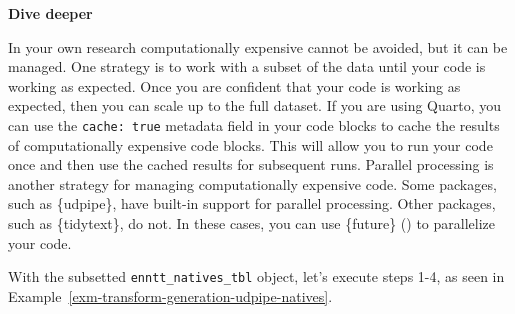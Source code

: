 \documentclass[
  letterpaper,
  krantz1]{latex/krantz-mod}
\theoremstyle{definition}
\theoremstyle{definition}
\theoremstyle{remark}
\begin{document}
\begin{tcolorbox}[enhanced jigsaw, leftrule=.75mm, colframe=quarto-callout-color-frame, left=2mm, colback=white, toprule=.15mm, breakable, arc=.35mm, opacityback=0, bottomrule=.15mm, rightrule=.15mm]

\textbf{ Dive deeper}

In your own research computationally expensive cannot be avoided, but it
can be managed. One strategy is to work with a subset of the data until
your code is working as expected. Once you are confident that your code
is working as expected, then you can scale up to the full dataset. If
you are using Quarto, you can use the \texttt{cache:\ true} metadata
field in your code blocks to cache the results of computationally
expensive code blocks. This will allow you to run your code once and
then use the cached results for subsequent runs. Parallel processing is
another strategy for managing computationally expensive code. Some
packages, such as \{udpipe\}, have built-in support for parallel
processing. Other packages, such as \{tidytext\}, do not. In these
cases, you can use \{future\} ()
to parallelize your code.

\end{tcolorbox}

With the subsetted \texttt{enntt\_natives\_tbl} object, let's execute
steps 1-4, as seen in
Example~\ref{exm-transform-generation-udpipe-natives}.
\end{document}
